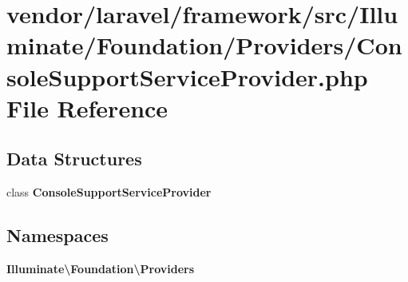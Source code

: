 \section{vendor/laravel/framework/src/\+Illuminate/\+Foundation/\+Providers/\+Console\+Support\+Service\+Provider.php File Reference}
\label{_console_support_service_provider_8php}
\subsection*{Data Structures}
\begin{DoxyCompactItemize}
\item 
class {\bf Console\+Support\+Service\+Provider}
\end{DoxyCompactItemize}
\subsection*{Namespaces}
\begin{DoxyCompactItemize}
\item 
 {\bf Illuminate\textbackslash{}\+Foundation\textbackslash{}\+Providers}
\end{DoxyCompactItemize}
